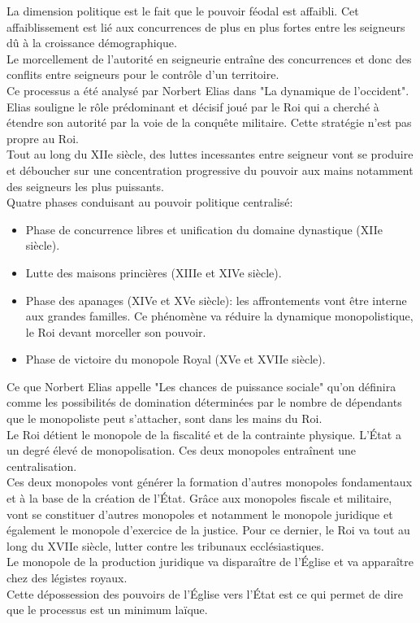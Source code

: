 \documentclass[10pt, a4paper, openany]{book}
\begin{document}
La dimension politique est le fait que le pouvoir féodal est affaibli. Cet affaiblissement est lié aux concurrences de plus en plus fortes entre les seigneurs dû à la croissance démographique. \\
Le morcellement de l'autorité en seigneurie entraîne des concurrences et donc des conflits entre seigneurs pour le contrôle d'un territoire. \\
Ce processus a été analysé par Norbert Elias dans "La dynamique de l'occident". Elias souligne le rôle prédominant et décisif joué par le Roi qui a cherché à étendre son autorité par la voie de la conquête militaire. Cette stratégie n'est pas propre au Roi. \\
Tout au long du XIIe siècle, des luttes incessantes entre seigneur vont se produire et déboucher sur une concentration progressive du pouvoir aux mains notamment des seigneurs les plus puissants. \\
Quatre phases conduisant au pouvoir politique centralisé: 
\begin{itemize}
\item Phase de concurrence libres et unification du domaine dynastique (XIIe siècle).
\item Lutte des maisons princières (XIIIe et XIVe siècle).
\item Phase des apanages (XIVe et XVe siècle): les affrontements vont être interne aux grandes familles. Ce phénomène va réduire la dynamique monopolistique, le Roi devant morceller son pouvoir. 
\item Phase de victoire du monopole Royal (XVe et XVIIe siècle). 
\end{itemize}


Ce que Norbert Elias appelle "Les chances de puissance sociale" qu'on définira comme les possibilités de domination déterminées par le nombre de dépendants que le monopoliste peut s'attacher, sont dans les mains du Roi. \\
Le Roi détient le monopole de la fiscalité et de la contrainte physique. L'État a un degré élevé de monopolisation. Ces deux monopoles entraînent une centralisation. \\
Ces deux monopoles vont générer la formation d'autres monopoles fondamentaux et à la base de la création de l'État. Grâce aux monopoles fiscale et militaire, vont se constituer d'autres monopoles et notamment le monopole juridique et également le monopole d'exercice de la justice. Pour ce dernier, le Roi va tout au long du XVIIe siècle, lutter contre les tribunaux ecclésiastiques. \\
Le monopole de la production juridique va disparaître de l'Église et va apparaître chez des légistes royaux. \\
Cette dépossession des pouvoirs de l'Église vers l'État est ce qui permet de dire que le processus est un minimum laïque. 
\end{document}
